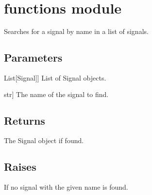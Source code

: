 \documentclass[letterpaper,10pt,english]{sphinxmanual}
\begin{document}
\sphinxstepscope


\section{functions module}
\label{\detokenize{functions:module-functions}}\label{\detokenize{functions:functions-module}}\label{\detokenize{functions::doc}}

\begin{fulllineitems}
\label{\detokenize{functions:functions.find_signal}}
\pysigstartsignatures
{}
\pysigstopsignatures
\sphinxAtStartPar
Searches for a signal by name in a list of signals.


\subsection{Parameters}
\label{\detokenize{functions:parameters}}\begin{description}
\sphinxlineitem{signals\_list}{[}List{[}Signal{]}{]}
\sphinxAtStartPar
List of Signal objects.

\sphinxlineitem{name}{[}str{]}
\sphinxAtStartPar
The name of the signal to find.

\end{description}


\subsection{Returns}
\label{\detokenize{functions:returns}}\begin{description}
\sphinxAtStartPar
The Signal object if found.

\end{description}


\subsection{Raises}
\label{\detokenize{functions:raises}}\begin{description}
\sphinxAtStartPar
If no signal with the given name is found.

\end{description}

\end{fulllineitems}
\end{document}
